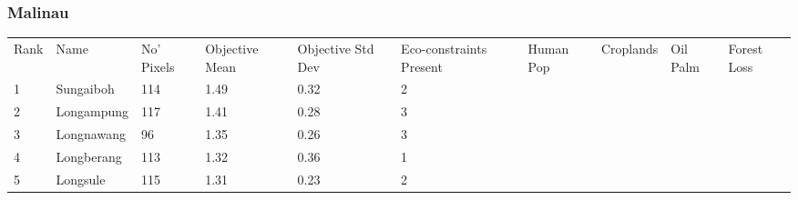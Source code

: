 \subsubsection{Malinau}
\begin{table}[ht]
\centering
\begingroup\fontsize{9pt}{10pt}\selectfont
\begin{tabular}{C{0.05\textwidth}C{0.15\textwidth}C{0.08\textwidth}C{0.08\textwidth}C{0.08\textwidth}C{0.08\textwidth}C{0.08\textwidth}C{0.08\textwidth}C{0.08\textwidth}C{0.08\textwidth}}
 Rank & Name & No' Pixels & Objective Mean & Objective Std Dev & Eco-constraints  Present & Human Pop & Croplands & Oil Palm & Forest Loss \\ 
 {1} & Sungaiboh & 114 & \textcolor[HTML]{FFFFFF}{1.49} & \textcolor[HTML]{FFFFFF}{0.32} & \textcolor[HTML]{000000}{2} &  &  &  &  \\ 
  {2} & Longampung & 117 & \textcolor[HTML]{FFFFFF}{1.41} & \textcolor[HTML]{000000}{0.28} & \textcolor[HTML]{FFFFFF}{3} &  &  &  &  \\ 
  {3} & Longnawang &  96 & \textcolor[HTML]{FFFFFF}{1.35} & \textcolor[HTML]{000000}{0.26} & \textcolor[HTML]{FFFFFF}{3} &  &  &  &  \\ 
  {4} & Longberang & 113 & \textcolor[HTML]{FFFFFF}{1.32} & \textcolor[HTML]{FFFFFF}{0.36} & \textcolor[HTML]{000000}{1} &  &  &  &  \\ 
  {5} & Longsule & 115 & \textcolor[HTML]{FFFFFF}{1.31} & \textcolor[HTML]{000000}{0.23} & \textcolor[HTML]{000000}{2} &  &  &  &  \\ 

\end{tabular}
\end{table}
